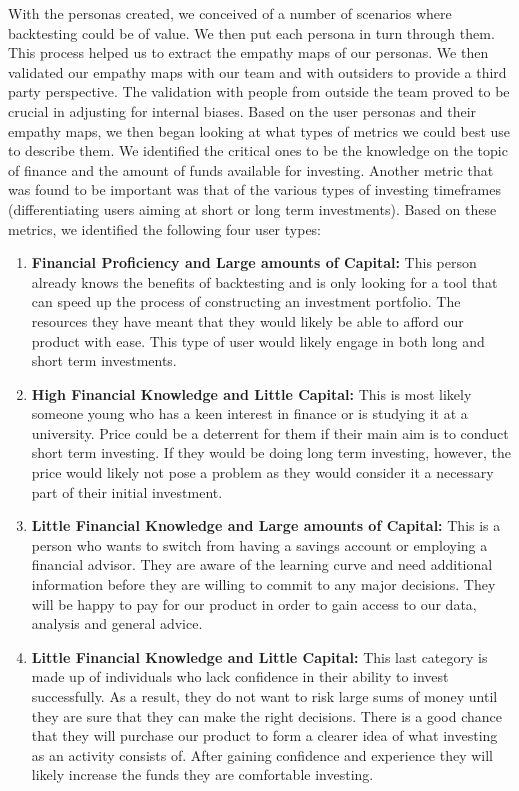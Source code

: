 \documentclass[main.tex]{subfiles}
\begin{document}
With the personas created, we conceived of a number of scenarios where backtesting could be of value. We then put each persona in turn through them. This process helped us to extract the empathy maps \cite{empathy_maps} of our personas. We then validated our empathy maps with our team and with outsiders to provide a third party perspective. The validation with people from outside the team proved to be crucial in adjusting for internal biases.
Based on the user personas and their empathy maps, we then began looking at what types of metrics we could best use to describe them. We identified the critical ones to be the knowledge on the topic of finance and the amount of funds available for investing. Another metric that was found to be important was that of the various types of investing timeframes (differentiating users aiming at short or long term investments). Based on these metrics, we identified the following four user types:

\begin{enumerate}
    \item \textbf{Financial Proficiency and Large amounts of Capital:  }This person already knows the benefits of backtesting and is only looking for a tool that can speed up the process of constructing an investment portfolio. The resources they have meant that they would likely be able to afford our product with ease. This type of user would likely engage in both long and short term investments.
    \item \textbf{High Financial Knowledge and Little Capital:  } This is most likely someone young who has a keen interest in finance or is studying it at a university. Price could be a deterrent for them if their main aim is to conduct short term investing. If they would be doing long term investing, however, the price would likely not pose a problem as they would consider it a necessary part of their initial investment.
    \item \textbf{Little Financial Knowledge and Large amounts of Capital:  }This is a person who wants to switch from having a savings account or employing a financial advisor. They are aware of the learning curve and need additional information before they are willing to commit to any major decisions. They will be happy to pay for our product in order to gain access to our data, analysis and general advice.
    \item \textbf{Little Financial Knowledge and Little Capital:  }This last category is made up of individuals who lack confidence in their ability to invest successfully. As a result, they do not want to risk large sums of money until they are sure that they can make the right decisions. There is a good chance that they will purchase our product to form a clearer idea of what investing as an activity consists of. After gaining confidence and experience they will likely increase the funds they are comfortable investing.
\end{enumerate}
\end{document}
